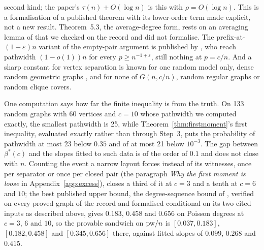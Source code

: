 second kind; the paper's $\tau(n)+O(\log n)$ is this with $\rho=O(\log n)$.
This is a formalisation of a published theorem with its lower-order term
made explicit, not a new result. Theorem~5.3, the average-degree form,
rests on an averaging lemma of \citet{EdwardsFarr2012} that we checked on
the record and did not formalise.
The prefix-at-$(1-\varepsilon)n$ variant of the
empty-pair argument is published by \citet{CheungGirardet2020}, who reach
pathwidth $(1-o(1))n$ for every $p\ge n^{-1+\varepsilon}$, still nothing at
$p=c/n$. And a sharp constant for vertex separation is known for one random
model only, dense random geometric graphs \citep{DiazPenrosePetitSerna2001},
and for none of $G(n,c/n)$, random regular graphs or random clique covers.

One computation says how far the finite inequality is from the truth. On
133 random graphs with 60 vertices and $c=10$ whose pathwidth we computed
exactly, the smallest pathwidth is 25, while Theorem~\ref{thm:firstmoment}'s
first inequality, evaluated exactly rather than through Step~3, puts the
probability of pathwidth at most 23 below $0.35$ and of at most 21 below
$10^{-3}$. The gap between $\beta^{*}(c)$ and the slopes fitted to such data
is of the order of $0.1$ and does not close with $n$. Counting the event a
narrow layout forces instead of its witnesses, once per separator or once per
closed pair (the paragraph \emph{Why the first moment is loose} in
Appendix~\ref{app:excess}), closes a third of it at $c=3$ and a tenth at $c=6$
and $10$; the best published upper bound, the degree-sequence bound of
\citet[Corollary~5.2]{EdwardsMcDermid2015}, verified on every proved graph of
the record and formalised conditional on its two cited inputs as described
above, gives $0.183$, $0.458$ and $0.656$
on Poisson degrees at $c=3$, $6$ and $10$, so the provable sandwich on
$\mathrm{pw}/n$ is $[0.037,0.183]$, $[0.182,0.458]$ and $[0.345,0.656]$ there, against
fitted slopes of $0.099$, $0.268$ and $0.415$.
